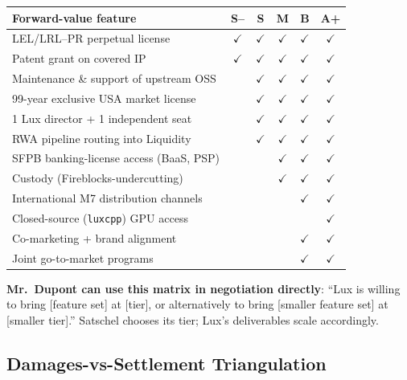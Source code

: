\documentclass[11pt,letterpaper]{article}
\begin{document}
\begin{center}
\begin{small}
\begin{tabular}{p{4.5cm} ccccc}
\toprule
\textbf{Forward-value feature} & \textbf{S--} & \textbf{S} & \textbf{M} & \textbf{B} & \textbf{A+} \\
\midrule
LEL/LRL--PR perpetual license & $\checkmark$ & $\checkmark$ & $\checkmark$ & $\checkmark$ & $\checkmark$ \\
Patent grant on covered IP & $\checkmark$ & $\checkmark$ & $\checkmark$ & $\checkmark$ & $\checkmark$ \\
Maintenance \& support of upstream OSS & & $\checkmark$ & $\checkmark$ & $\checkmark$ & $\checkmark$ \\
99-year exclusive USA market license & & $\checkmark$ & $\checkmark$ & $\checkmark$ & $\checkmark$ \\
1 Lux director + 1 independent seat & & $\checkmark$ & $\checkmark$ & $\checkmark$ & $\checkmark$ \\
RWA pipeline routing into Liquidity & & $\checkmark$ & $\checkmark$ & $\checkmark$ & $\checkmark$ \\
SFPB banking-license access (BaaS, PSP) & & & $\checkmark$ & $\checkmark$ & $\checkmark$ \\
Custody (Fireblocks-undercutting) & & & $\checkmark$ & $\checkmark$ & $\checkmark$ \\
International M7 distribution channels & & & & $\checkmark$ & $\checkmark$ \\
Closed-source (\texttt{luxcpp}) GPU access & & & & & $\checkmark$ \\
Co-marketing + brand alignment & & & & $\checkmark$ & $\checkmark$ \\
Joint go-to-market programs & & & & $\checkmark$ & $\checkmark$ \\
\bottomrule
\end{tabular}
\end{small}
\end{center}

\textbf{Mr.\ Dupont can use this matrix in negotiation directly}:
``Lux is willing to bring [feature set] at [tier], or alternatively
to bring [smaller feature set] at [smaller tier].'' Satschel chooses
its tier; Lux's deliverables scale accordingly.

\subsection*{Damages-vs-Settlement Triangulation}
\end{document}
